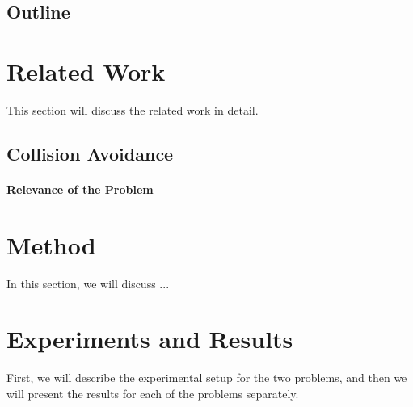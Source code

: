 \documentclass[a4paper,12pt]{article}
\begin{document}
\subsection{Outline}











\section{Related Work}
\label{rel_work}

This section will discuss the related work in detail. 




\subsection{Collision Avoidance}
\label{rel_work_collision}

\paragraph{Relevance of the Problem}


















\section{Method}
\label{method}

In this section, we will discuss ...





\section{Experiments and Results}
\label{sec:experiments_and_results}

First, we will describe the experimental setup for the two problems, and then we will present the results for each of the problems separately.
\end{document}
